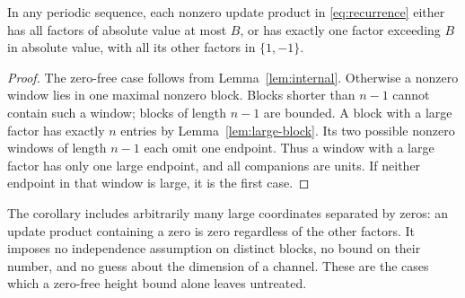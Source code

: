 \begin{corollary}
\label{cor:window}
In any periodic sequence, each nonzero update product in
\eqref{eq:recurrence} either has all factors of absolute value at
most $B$, or has exactly one factor exceeding $B$ in absolute value,
with all its other factors in $\{1,-1\}$.
\end{corollary}
\begin{proof}
The zero-free case follows from Lemma~\ref{lem:internal}. Otherwise
a nonzero window lies in one maximal nonzero block. Blocks shorter
than $n-1$ cannot contain such a window; blocks of length $n-1$ are
bounded. A block with a large factor has exactly $n$ entries by
Lemma~\ref{lem:large-block}. Its two possible nonzero windows of
length $n-1$ each omit one endpoint. Thus a window with a large
factor has only one large endpoint, and all companions are units.
If neither endpoint in that window is large, it is the first case.
\end{proof}

The corollary includes arbitrarily many large coordinates separated
by zeros: an update product containing a zero is zero regardless of
the other factors. It imposes no independence assumption on distinct
blocks, no bound on their number, and no guess about the dimension
of a channel. These are the cases which a zero-free height bound
alone leaves untreated.
